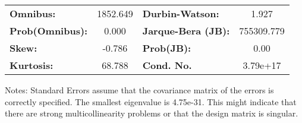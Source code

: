 \begin{center}
\begin{tabular}{lcccccc}
\bottomrule
\end{tabular}
\begin{tabular}{lclc}
\textbf{Omnibus:}       & 1852.649 & \textbf{  Durbin-Watson:     } &     1.927   \\
\textbf{Prob(Omnibus):} &   0.000  & \textbf{  Jarque-Bera (JB):  } & 755309.779  \\
\textbf{Skew:}          &  -0.786  & \textbf{  Prob(JB):          } &      0.00   \\
\textbf{Kurtosis:}      &  68.788  & \textbf{  Cond. No.          } &  3.79e+17   \\
\bottomrule
\end{tabular}
\end{center}

Notes: \newline
 [1] Standard Errors assume that the covariance matrix of the errors is correctly specified. \newline
 [2] The smallest eigenvalue is 4.75e-31. This might indicate that there are \newline
 strong multicollinearity problems or that the design matrix is singular.